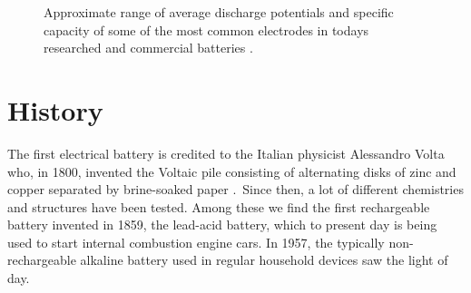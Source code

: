 \documentclass[Main/main.tex]{subfiles}
\begin{document}
\begin{figure}[ht]
    \caption{Approximate range of average discharge potentials and specific capacity of some of the most common electrodes in todays researched and commercial batteries \cite{1_rev_liion}.}
    \label{fig:1_discharge_specific}
\end{figure}

\newpage
\section{History}

The first electrical battery is credited to the Italian physicist Alessandro Volta who, in 1800, invented the Voltaic pile consisting of alternating disks of zinc and copper separated by brine-soaked paper \cite{1_volta}.\  Since then, a lot of different chemistries and structures have been tested. Among these we find the first rechargeable battery invented in 1859, the lead-acid battery, which to present day is being used to start internal combustion engine cars. In 1957, the typically non-rechargeable alkaline battery used in regular household devices saw the light of day. \cite{1_yazami}
\end{document}
